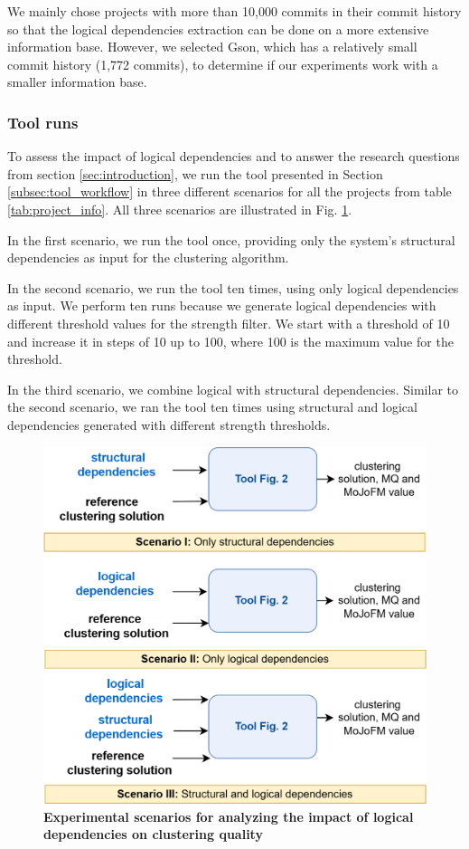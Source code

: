 \documentclass[12pt, a4paper, twoside]{report}
\begin{document}
We mainly chose projects with more than 10,000 commits in their commit history so that the logical dependencies extraction can be done on a more extensive information base. However, we selected Gson, which has a relatively small commit history (1,772 commits), to determine if our experiments work with a smaller information base.

\subsubsection{Tool runs}

To assess the impact of logical dependencies and to answer the research questions from section \ref{sec:introduction}, we run the tool presented in Section \ref{subsec:tool_workflow} in three different scenarios for all the projects from table \ref{tab:project_info}. All three scenarios are illustrated in Fig. \ref{fig:scenatrio}.

In the first scenario, we run the tool once, providing only the system's structural dependencies as input for the clustering algorithm.

In the second scenario, we run the tool ten times, using only logical dependencies as input. We perform ten runs because we generate logical dependencies with different threshold values for the strength filter. We start with a threshold of 10 and increase it in steps of 10 up to 100, where 100 is the maximum value for the threshold.

In the third scenario, we combine logical with structural dependencies. Similar to the second scenario, we ran the tool ten times using structural and logical dependencies generated with different strength thresholds.

\begin{figure}[t!]
  \centering
  \includegraphics[width=\columnwidth]{scenario.png}
  \caption{ \textbf{Experimental scenarios for analyzing the impact of logical dependencies on clustering quality}}
  \label{fig:scenatrio}
\end{figure}
\end{document}
